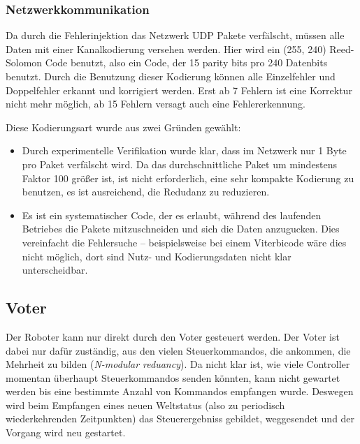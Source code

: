 {\subsubsection{Netzwerkkommunikation}
Da durch die Fehlerinjektion das Netzwerk UDP Pakete verf{\"{a}}lscht, m{\"{u}}ssen alle Daten mit einer 
Kanalkodierung versehen werden. Hier wird ein (255, 240) Reed-Solomon Code benutzt, also ein Code, der 15 parity 
bits pro 240 Datenbits benutzt. Durch die Benutzung dieser Kodierung k{\"{o}}nnen alle Einzelfehler und 
Doppelfehler erkannt und korrigiert werden. Erst ab 7 Fehlern ist eine Korrektur nicht mehr m{\"{o}}glich, ab 15 
Fehlern versagt auch eine Fehlererkennung.

Diese Kodierungsart wurde aus zwei Gr{\"{u}}nden gew{\"{a}}hlt:
\begin{itemize}
\item Durch experimentelle Verifikation wurde klar, dass im Netzwerk nur 1 Byte pro Paket verf{\"{a}}lscht wird.
	Da das durchschnittliche Paket um mindestens Faktor 100 gr{\"{o}}{\ss}er ist, ist nicht erforderlich,
	eine sehr kompakte Kodierung zu benutzen, es ist ausreichend, die Redudanz zu reduzieren. 
\item Es ist ein systematischer Code, der es erlaubt, w{\"{a}}hrend des laufenden Betriebes die Pakete 
	mitzuschneiden und sich die Daten anzugucken. Dies vereinfacht die Fehlersuche -- beispielsweise bei
	einem Viterbicode w{\"{a}}re dies nicht m{\"{o}}glich, dort sind Nutz- und Kodierungsdaten nicht klar 
	unterscheidbar.
\end{itemize}

\subsection{Voter}
\label{voter}
Der Roboter kann nur direkt durch den Voter gesteuert werden. Der Voter ist dabei nur daf{\"{u}}r
zust{\"{a}}ndig, aus den vielen Steuerkommandos, die ankommen, die Mehrheit zu bilden (\textit{N-modular reduancy}).
Da nicht klar ist, wie viele Controller momentan {\"{u}}berhaupt Steuerkommandos senden k{\"{o}}nnten,
kann nicht gewartet werden bis eine bestimmte Anzahl von Kommandos empfangen wurde. Deswegen wird beim Empfangen
eines neuen Weltstatus (also zu periodisch wiederkehrenden Zeitpunkten) das Steuerergebniss gebildet,
weggesendet und der Vorgang wird neu gestartet.

}
